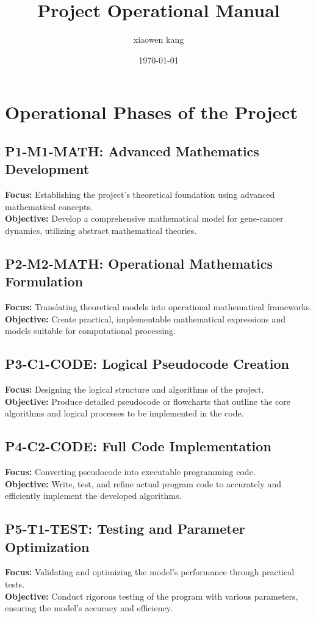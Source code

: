 \documentclass{article}
\title{Project Operational Manual}
\author{xiaowen kang}
\date{\today}
\begin{document}
\maketitle

\section{Operational Phases of the Project}

\subsection{P1-M1-MATH: Advanced Mathematics Development}
\textbf{Focus:} Establishing the project's theoretical foundation using advanced mathematical concepts. \\
\textbf{Objective:} Develop a comprehensive mathematical model for gene-cancer dynamics, utilizing abstract mathematical theories.

\subsection{P2-M2-MATH: Operational Mathematics Formulation}
\textbf{Focus:} Translating theoretical models into operational mathematical frameworks. \\
\textbf{Objective:} Create practical, implementable mathematical expressions and models suitable for computational processing.

\subsection{P3-C1-CODE: Logical Pseudocode Creation}
\textbf{Focus:} Designing the logical structure and algorithms of the project. \\
\textbf{Objective:} Produce detailed pseudocode or flowcharts that outline the core algorithms and logical processes to be implemented in the code.

\subsection{P4-C2-CODE: Full Code Implementation}
\textbf{Focus:} Converting pseudocode into executable programming code. \\
\textbf{Objective:} Write, test, and refine actual program code to accurately and efficiently implement the developed algorithms.

\subsection{P5-T1-TEST: Testing and Parameter Optimization}
\textbf{Focus:} Validating and optimizing the model's performance through practical tests. \\
\textbf{Objective:} Conduct rigorous testing of the program with various parameters, ensuring the model's accuracy and efficiency.
\end{document}
